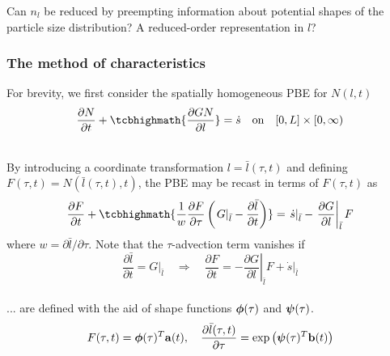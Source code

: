 \documentclass[10pt,xcolor=dvipsnames]{beamer}
\begin{document}
\begin{frame}[t]
  \begin{snugshade}
  \justifying Can $n_l$ be reduced by preempting information about potential shapes of the particle size distribution? A reduced-order representation in $l$?
  \end{snugshade}

\end{frame}


\begin{frame}[t]

  \frametitle{The method of characteristics}


  For brevity, we first consider the spatially homogeneous PBE for $N(l, t)$
  \begin{equation*}
    \frac{\partial N}{\partial t} + \tcbhighmath{\frac{\partial G N}{\partial l}} = \dot{s} \quad\text{on}\quad [0, L] \times [0, \infty)
  \end{equation*}

  \\
  \justifying By introducing a coordinate transformation $l = \bar{l}(\tau, t)$ and defining $F(\tau, t) = N(\bar{l}(\tau, t), t)$, the PBE may be recast in terms of $F(\tau, t)$ as
  \begin{equation*}
  \begin{split}
    \frac{\partial F}{\partial t}
    + \tcbhighmath{\frac{1}{w} \frac{\partial F}{\partial\tau}
    \left(\left.G\right|_{\bar{l}} - \frac{\partial\bar{l}}{\partial t}\right)}
    = \left.\dot{s}\right|_{\bar{l}} - \left.\frac{\partial G}{\partial l}\right|_{\bar{l}} F
  \label{eq:pbe:F}
  \end{split}
  \end{equation*}
  where $w = \partial\bar{l}/\partial\tau$. Note that the $\tau$-advection term vanishes if
  \begin{equation*}
    \frac{\partial\bar{l}}{\partial t} = \left.G\right|_{\bar{l}} \quad\Rightarrow\quad \frac{\partial F}{\partial t} =
    -\left.\frac{\partial G}{\partial l}\right|_{\bar{l}} F + \left.\dot{s}\right|_{\bar{l}}
  \label{eq:pbepod}
  \end{equation*}
  \justifying{}\\
  ... are defined with the aid of shape functions ${\boldsymbol \phi}(\tau)$ and ${\boldsymbol \psi}(\tau)$.
  \begin{equation*}
    F(\tau, t) = {\boldsymbol \phi}(\tau)^T {\mathbf a}(t), \quad
    \frac{\partial\bar{l}(\tau, t)}{\partial\tau} = \exp\left({\boldsymbol \psi}(\tau)^T{\mathbf b}(t)\right)
  \label{eq:discrete}
  \end{equation*}

\end{frame}
\end{document}
